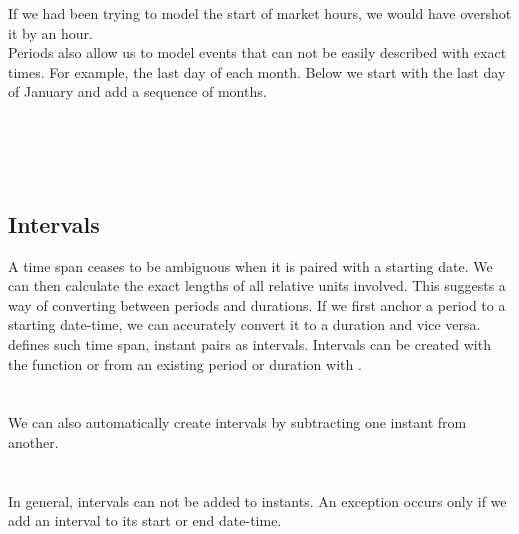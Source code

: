\documentclass[article]{jss}
\begin{document}
If we had been trying to model the start of market hours, we would have overshot it by an hour. \\

Periods also allow us to model events that can not be easily described with exact times. For example, the last day of each month. Below we start with the last day of January and add a sequence of months.\\

\\
\code{ [ [1] "2010-01-31 CST" "2010-02-28 CST" "2010-03-31 CDT" "2010-04-30 CDT"}\\
 \\
\\

\subsection{Intervals}
\label{sec:intervals}

A time span ceases to be ambiguous when it is paired with a starting date. We can then calculate the exact lengths of all relative units involved. This suggests a way of converting between periods and durations. If we first anchor a period to a starting date-time, we can accurately convert it to a duration and vice versa.  defines such time span, instant pairs as intervals. Intervals can be created with the function  or from an existing period or duration with .\\

\\
\\

We can also automatically create intervals by subtracting one instant from another.\\

\\
\\

In general, intervals can not be added to instants. An exception occurs only if we add an interval to its start or end date-time.\\
\end{document}
